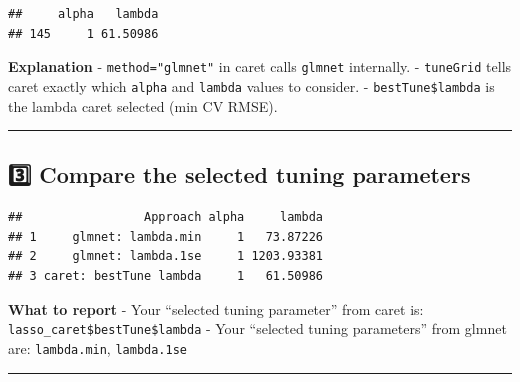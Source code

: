 \documentclass[
]{article}
\newenvironment{Shaded}{\begin{snugshade}}{\end{snugshade}}
\newcommand{\AttributeTok}[1]{\textcolor[rgb]{0.13,0.29,0.53}{#1}}
\newcommand{\DecValTok}[1]{\textcolor[rgb]{0.00,0.00,0.81}{#1}}
\newcommand{\FunctionTok}[1]{\textcolor[rgb]{0.13,0.29,0.53}{\textbf{#1}}}
\newcommand{\NormalTok}[1]{#1}
\newcommand{\OtherTok}[1]{\textcolor[rgb]{0.56,0.35,0.01}{#1}}
\newcommand{\SpecialCharTok}[1]{\textcolor[rgb]{0.81,0.36,0.00}{\textbf{#1}}}
\newcommand{\StringTok}[1]{\textcolor[rgb]{0.31,0.60,0.02}{#1}}
\begin{document}
\begin{verbatim}
##     alpha   lambda
## 145     1 61.50986
\end{verbatim}

\textbf{Explanation} - \texttt{method="glmnet"} in caret calls
\texttt{glmnet} internally. - \texttt{tuneGrid} tells caret exactly
which \texttt{alpha} and \texttt{lambda} values to consider. -
\texttt{bestTune\$lambda} is the lambda caret selected (min CV RMSE).

\begin{center}\rule{0.5\linewidth}{0.5pt}\end{center}

\subsection{3️⃣ Compare the selected tuning
parameters}\label{compare-the-selected-tuning-parameters}

\begin{Shaded}
\end{Shaded}

\begin{verbatim}
##                 Approach alpha     lambda
## 1     glmnet: lambda.min     1   73.87226
## 2     glmnet: lambda.1se     1 1203.93381
## 3 caret: bestTune lambda     1   61.50986
\end{verbatim}

\textbf{What to report} - Your ``selected tuning parameter'' from caret
is: \texttt{lasso\_caret\$bestTune\$lambda} - Your ``selected tuning
parameters'' from glmnet are: \texttt{lambda.min}, \texttt{lambda.1se}

\begin{center}\rule{0.5\linewidth}{0.5pt}\end{center}
\end{document}

